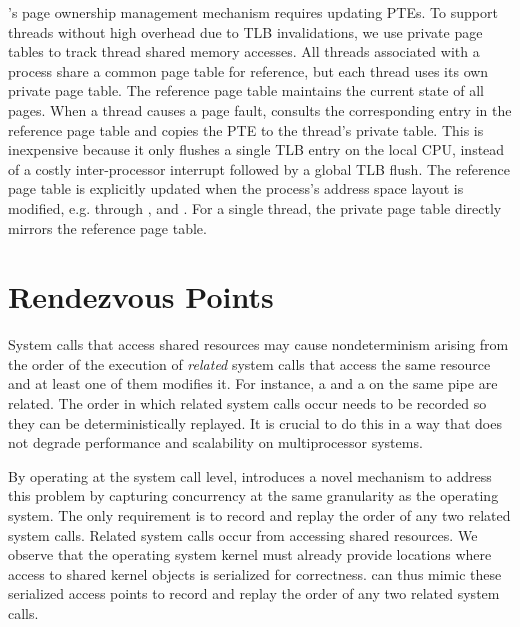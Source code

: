 \begin{table}[]
  

\scribe{}'s page ownership management mechanism requires updating
PTEs.  To support threads without high
overhead due to TLB invalidations, we use private page tables to
track thread shared memory accesses.  All threads associated with
a process share a common
page table for reference, but each thread uses its own private
page table.  The reference page table maintains the current
state of all pages.  When a thread causes a page fault, \scribe{}
consults the corresponding entry in the reference page table and
copies the PTE to the thread's private table. This is inexpensive
because it only flushes a single TLB entry on the local CPU, instead
of a costly inter-processor interrupt followed by a global TLB flush.
The reference page table
is explicitly updated when the process's
address space layout is modified, e.g. through ,  and
. For a
single thread, the private page table directly mirrors the reference
page table. 

 

	

 

  
\section{Rendezvous Points}
\label{scribe:sec:rendezvous}

System calls that access shared resources may cause nondeterminism
arising from the order of the execution of {\em related} system calls
that access the same resource and at least one of them modifies it.
For instance, a  and a  on the same pipe are
related. The order in which related system calls occur needs to be
recorded so they can be deterministically replayed.  It is crucial
to do this in a way that does not degrade performance and scalability
on multiprocessor systems.

By operating at the system call level, \scribe{} introduces a novel
mechanism to address this problem by capturing concurrency at the same
granularity as the operating system.  The only requirement is
to record and replay the order of any two related system calls.
Related system calls occur from accessing shared resources.  We
observe that the operating system kernel must already provide
locations where access to shared kernel objects is serialized for
correctness.  \scribe{} can thus mimic these serialized access
points to record and replay the order of any two related system calls.


\end{table}
